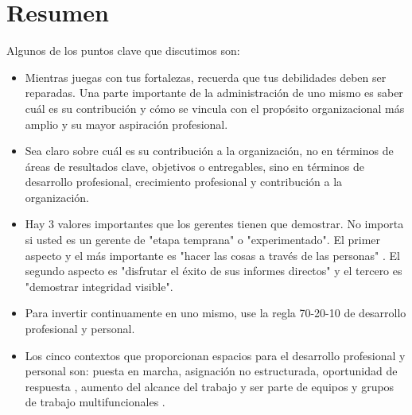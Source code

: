 \documentclass[10pt]{book}
\begin{document}
\section{Resumen}
Algunos de los puntos clave que discutimos son:
\begin{itemize}
\item  Mientras juegas con tus fortalezas, recuerda que tus debilidades deben ser reparadas.
Una parte importante de la administración de uno mismo es  saber cuál es su contribución y cómo se vincula con el propósito organizacional más amplio y su mayor aspiración profesional. 
\item Sea claro sobre cuál es su contribución a la organización, no en términos de áreas de resultados clave, objetivos o entregables, sino en términos de desarrollo profesional, crecimiento profesional y contribución a la organización.
\item Hay 3 valores importantes que los gerentes tienen que demostrar. No importa si usted es un gerente de "etapa temprana" o "experimentado". El primer aspecto y el más importante es "hacer las cosas a través de las personas" . El segundo aspecto es "disfrutar el éxito de sus informes directos" y el tercero es "demostrar integridad visible".
\item Para invertir continuamente en uno mismo, use la regla 70-20-10 de desarrollo profesional y personal.
\item Los cinco contextos que proporcionan espacios para el desarrollo profesional y personal son: puesta en marcha, asignación no estructurada, oportunidad de respuesta , aumento del alcance del trabajo y ser parte de equipos y grupos de trabajo multifuncionales .
\end{itemize}
\end{document}
